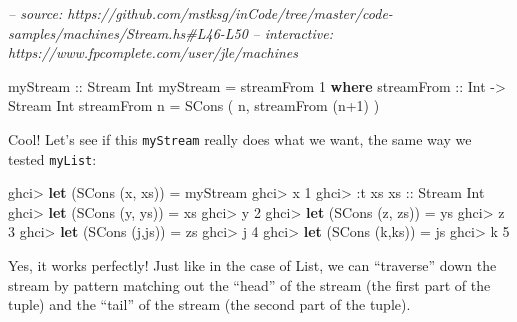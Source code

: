 \documentclass[]{article}
\newenvironment{Shaded}{}{}
\newcommand{\CommentTok}[1]{\textcolor[rgb]{0.38,0.63,0.69}{\textit{#1}}}
\newcommand{\DataTypeTok}[1]{\textcolor[rgb]{0.56,0.13,0.00}{#1}}
\newcommand{\DecValTok}[1]{\textcolor[rgb]{0.25,0.63,0.44}{#1}}
\newcommand{\FunctionTok}[1]{\textcolor[rgb]{0.02,0.16,0.49}{#1}}
\newcommand{\KeywordTok}[1]{\textcolor[rgb]{0.00,0.44,0.13}{\textbf{#1}}}
\newcommand{\NormalTok}[1]{#1}
\newcommand{\OtherTok}[1]{\textcolor[rgb]{0.00,0.44,0.13}{#1}}
\begin{document}
\begin{Shaded}
\begin{Highlighting}[]
\CommentTok{-- source: https://github.com/mstksg/inCode/tree/master/code-samples/machines/Stream.hs#L46-L50}
\CommentTok{-- interactive: https://www.fpcomplete.com/user/jle/machines}

\OtherTok{myStream ::} \DataTypeTok{Stream} \DataTypeTok{Int}
\NormalTok{myStream }\FunctionTok{=}\NormalTok{ streamFrom }\DecValTok{1}
  \KeywordTok{where}
\OtherTok{    streamFrom ::} \DataTypeTok{Int} \OtherTok{->} \DataTypeTok{Stream} \DataTypeTok{Int}
\NormalTok{    streamFrom n }\FunctionTok{=} \DataTypeTok{SCons}\NormalTok{ ( n, streamFrom (n}\FunctionTok{+}\DecValTok{1}\NormalTok{) )}
\end{Highlighting}
\end{Shaded}

Cool! Let's see if this \texttt{myStream} really does what we want, the same way
we tested \texttt{myList}:

\begin{Shaded}
\begin{Highlighting}[]
\NormalTok{ghci}\FunctionTok{>} \KeywordTok{let}\NormalTok{ (}\DataTypeTok{SCons}\NormalTok{ (x, xs)) }\FunctionTok{=}\NormalTok{ myStream}
\NormalTok{ghci}\FunctionTok{>}\NormalTok{ x}
\DecValTok{1}
\NormalTok{ghci}\FunctionTok{>} \FunctionTok{:}\NormalTok{t xs}
\OtherTok{xs ::} \DataTypeTok{Stream} \DataTypeTok{Int}
\NormalTok{ghci}\FunctionTok{>} \KeywordTok{let}\NormalTok{ (}\DataTypeTok{SCons}\NormalTok{ (y, ys)) }\FunctionTok{=}\NormalTok{ xs}
\NormalTok{ghci}\FunctionTok{>}\NormalTok{ y}
\DecValTok{2}
\NormalTok{ghci}\FunctionTok{>} \KeywordTok{let}\NormalTok{ (}\DataTypeTok{SCons}\NormalTok{ (z, zs)) }\FunctionTok{=}\NormalTok{ ys}
\NormalTok{ghci}\FunctionTok{>}\NormalTok{ z}
\DecValTok{3}
\NormalTok{ghci}\FunctionTok{>} \KeywordTok{let}\NormalTok{ (}\DataTypeTok{SCons}\NormalTok{ (j,js)) }\FunctionTok{=}\NormalTok{ zs}
\NormalTok{ghci}\FunctionTok{>}\NormalTok{ j}
\DecValTok{4}
\NormalTok{ghci}\FunctionTok{>} \KeywordTok{let}\NormalTok{ (}\DataTypeTok{SCons}\NormalTok{ (k,ks)) }\FunctionTok{=}\NormalTok{ js}
\NormalTok{ghci}\FunctionTok{>}\NormalTok{ k}
\DecValTok{5}
\end{Highlighting}
\end{Shaded}

Yes, it works perfectly! Just like in the case of List, we can ``traverse'' down
the stream by pattern matching out the ``head'' of the stream (the first part of
the tuple) and the ``tail'' of the stream (the second part of the tuple).
\end{document}
